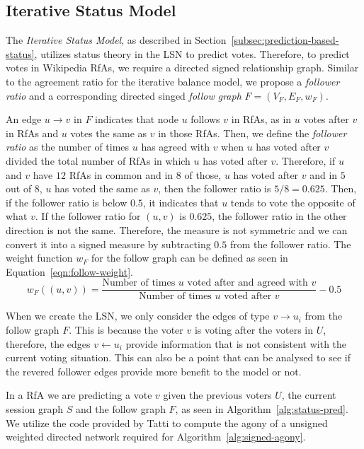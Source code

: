 \subsection{Iterative Status Model}
The \textit{Iterative Status Model}, as described in Section~\ref{subsec:prediction-based-status}, utilizes status theory in the LSN to predict votes.
Therefore, to predict votes in Wikipedia RfAs, we require a directed signed relationship graph.
Similar to the agreement ratio for the iterative balance model, we propose a \textit{follower ratio} and a corresponding directed singed \textit{follow graph} $F=(V_{F},E_{F},w_{F})$.

An edge $u \rightarrow v$ in $F$ indicates that node $u$ follows $v$ in RfAs, as in $u$ votes after $v$ in RfAs and $u$ votes the same as $v$ in those RfAs.
Then, we define the \textit{follower ratio} as the number of times $u$ has agreed with $v$ when $u$ has voted after $v$ divided the total number of RfAs in which $u$ has voted after $v$.
Therefore, if $u$ and $v$ have $12$ RfAs in common and in $8$ of those, $u$ has voted after $v$  and in $5$ out of $8$, $u$ has voted the same as $v$, then the follower ratio is $5/8 = 0.625$.  
Then, if the follower ratio is below $0.5$, it indicates that $u$ tends to vote the opposite of what $v$.
If the follower ratio for $(u,v)$ is $0.625$, the follower ratio in the other direction is not the same.
Therefore, the measure is not symmetric and we can convert it into a signed measure by subtracting $0.5$ from the follower ratio.
The weight function $w_{F}$ for the follow graph can be defined as seen in Equation~\eqref{eqn:follow-weight}. 
\begin{equation}
    \label{eqn:follow-weight}
    w_{F}((u,v)) = \frac{\text{Number of times } u \text{ voted after and agreed with } v }{\text{Number of times } u \text{ voted after } v} -0.5
\end{equation}

When we create the LSN, we only consider the edges of type $v \rightarrow u_{i}$ from the follow graph $F$.
This is because the voter $v$ is voting after the voters in $U$, therefore, the edges $v \leftarrow u_{i}$ provide information that is not consistent with the current voting situation.
This can also be a point that can be analysed to see if the revered follower edges provide more benefit to the model or not.

In a RfA we are predicting a vote $v$ given the previous voters $U$, the current session graph $S$ and the follow graph $F$, as seen in Algorithm~\ref{alg:status-pred}.
We utilize the code provided by Tatti \cite{tatti2017tiers} to compute the agony of a unsigned weighted directed network required for Algorithm~\ref{alg:signed-agony}.

